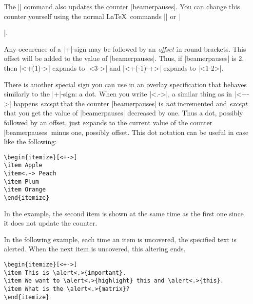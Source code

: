 The |\pause| command also updates the counter |beamerpauses|. You can change this counter yourself using the normal \LaTeX\ commands |\setcounter| or |\addtocounter|.

Any occurence of a |+|-sign may be followed by an \emph{offset} in round brackets. This offset will be added to the value of |beamerpauses|. Thus, if |beamerpauses| is 2, then |<+(1)->| expands to |<3->| and |<+(-1)-+>| expands to |<1-2>|.

There is another special sign you can use in an overlay specification that behaves similarly to the |+|-sign: a dot. When you write |<.->|, a similar thing as in |<+->| happens \emph{except} that the counter |beamerpauses| is \emph{not} incremented and \emph{except} that you get the value of |beamerpauses| decreased by one. Thus a dot, possibly followed by an offset, just expands to the current value of the counter |beamerpauses| minus one, possibly offset. This dot notation can be useful in case like the following:
\begin{verbatim}
\begin{itemize}[<+->]
\item Apple
\item<.-> Peach
\item Plum
\item Orange
\end{itemize}
\end{verbatim}

In the example, the second item is shown at the same time as the first one since it does not update the counter.

In the following example, each time an item is uncovered, the specified text is alerted. When the next item is uncovered, this altering ends.
\begin{verbatim}
\begin{itemize}[<+->]
\item This is \alert<.>{important}.
\item We want to \alert<.>{highlight} this and \alert<.>{this}.
\item What is the \alert<.>{matrix}?
\end{itemize}
\end{verbatim}
